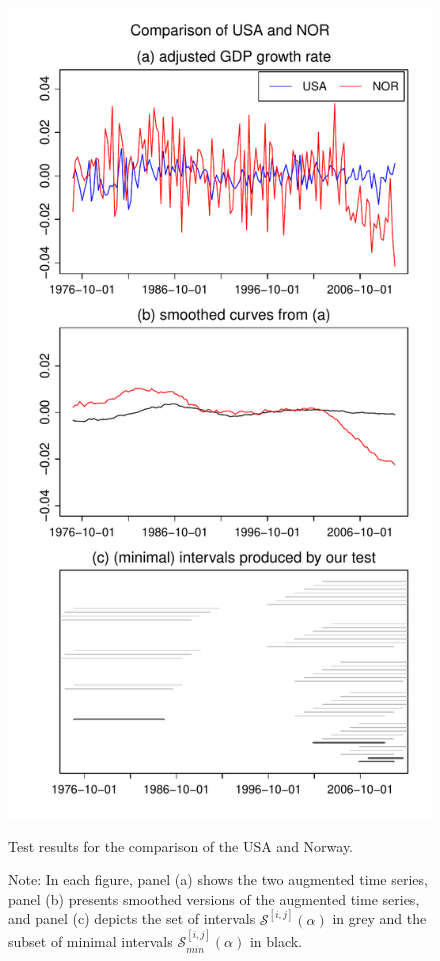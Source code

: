 \documentclass[a4paper,12pt]{article}
\begin{document}
\begin{figure}[p!]
\hspace{0.25cm}
\begin{minipage}[t]{0.49\textwidth}
\includegraphics[width=\textwidth]{Plots/USA_vs_NOR}
\caption{Test results for the comparison of the USA and Norway.}\label{fig:USA:Norway}
\end{minipage}

\caption*{Note: In each figure, panel (a) shows the two augmented time series, panel (b) presents smoothed versions of the augmented time series, and panel (c) depicts the set of intervals $\mathcal{S}^{[i,j]}(\alpha)$ in grey and the subset of minimal intervals $\mathcal{S}^{[i,j]}_{min}(\alpha)$ in black.}
\end{figure}
\end{document}
